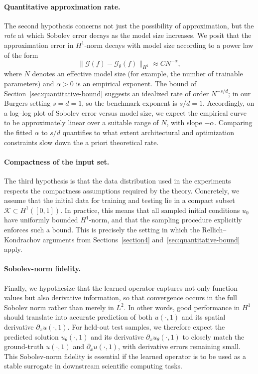 \documentclass[11pt]{article}
\theoremstyle{plain}
\theoremstyle{definition}
\theoremstyle{remark}
\begin{document}
\paragraph{Quantitative approximation rate.}
The second hypothesis concerns not just the possibility of approximation, but
the \emph{rate} at which Sobolev error decays as the model size increases. We
posit that the approximation error in $H^1$-norm decays with model size
according to a power law of the form
\[
\| \mathcal{G}(f) - \mathcal{G}_\theta(f) \|_{H^1} \approx C N^{-\alpha},
\]
where $N$ denotes an effective model size (for example, the number of
trainable parameters) and $\alpha > 0$ is an empirical exponent. The bound of
Section~\ref{sec:quantitative-bound} suggests an idealized rate of order
$N^{-s/d}$; in our Burgers setting $s=d=1$, so the benchmark exponent is
$s/d = 1$. Accordingly, on a log--log plot of Sobolev error versus model
size, we expect the empirical curve to be approximately linear over a suitable
range of $N$, with slope $-\alpha$. Comparing the fitted $\alpha$ to $s/d$
quantifies to what extent architectural and optimization constraints slow
down the a priori theoretical rate.

\paragraph{Compactness of the input set.}
The third hypothesis is that the data distribution used in the experiments
respects the compactness assumptions required by the theory. Concretely, we
assume that the initial data for training and testing lie in a compact subset
$\mathcal{K} \subset H^1([0,1])$. In practice, this means that all sampled
initial conditions $u_0$ have uniformly bounded $H^1$-norm, and that the
sampling procedure explicitly enforces such a bound. This is precisely the
setting in which the Rellich--Kondrachov arguments from
Sections~\ref{section4} and~\ref{sec:quantitative-bound} apply.

\paragraph{Sobolev-norm fidelity.}
Finally, we hypothesize that the learned operator captures not only function
values but also derivative information, so that convergence occurs in the full
Sobolev norm rather than merely in $L^2$. In other words, good performance in
$H^1$ should translate into accurate prediction of both $u(\cdot,1)$ and its
spatial derivative $\partial_x u(\cdot,1)$. For held-out test samples, we
therefore expect the predicted solution $u_\theta(\cdot,1)$ and its derivative
$\partial_x u_\theta(\cdot,1)$ to closely match the ground-truth $u(\cdot,1)$
and $\partial_x u(\cdot,1)$, with derivative errors remaining small. This
Sobolev-norm fidelity is essential if the learned operator is to be used as a
stable surrogate in downstream scientific computing tasks.
\end{document}
